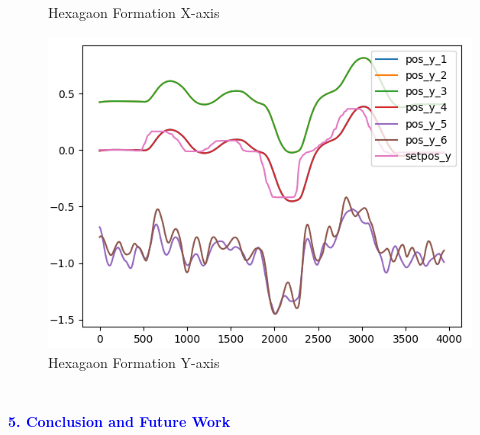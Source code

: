 \documentclass[10pt]{beamer}
\begin{document}
\begin{frame}{}
\begin{minipage}{0.47\textwidth}
\begin{figure}[h!]
           \caption{Hexagaon Formation X-axis}
           \label{Fig:poshex_x}
       \end{figure}
   \end{minipage}
   \begin{minipage}{0.47\textwidth}
            \begin{figure}[h!]
           \centering
           \includegraphics[scale=0.28]{hex_Y.png} 
           \caption{Hexagaon Formation Y-axis}
           \label{Fig:poshex_y}
       \end{figure}
   \end{minipage} 
\end{frame}

\section*{}
\begin{frame}{}
    \huge{\centerline{\textcolor{blue}{\textbf{5. Conclusion and Future Work}}}}
\end{frame}
\end{document}

